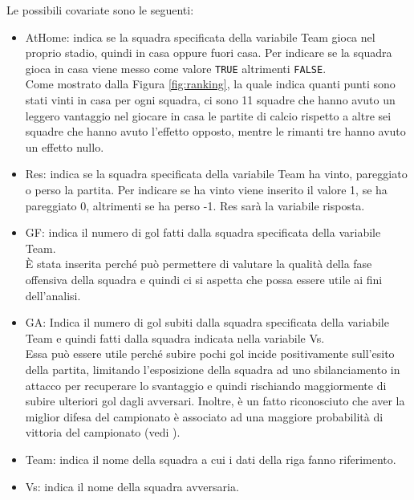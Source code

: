 Le possibili covariate sono le seguenti:
\begin{itemize}
	\item \textsf{AtHome}: indica se la squadra specificata della variabile \textsf{Team} gioca nel proprio stadio, quindi in casa oppure fuori casa. Per indicare se la squadra gioca in casa viene messo come valore \texttt{TRUE} altrimenti \texttt{FALSE}. \\
	Come mostrato dalla Figura \ref{fig:ranking}, la quale indica quanti punti sono stati vinti in casa per ogni squadra, ci sono 11 squadre che hanno avuto un leggero vantaggio nel giocare in casa le partite di calcio rispetto a altre sei squadre che hanno avuto l'effetto opposto, mentre le rimanti tre hanno avuto un effetto nullo.\\
	\item \textsf{Res}: indica se la squadra specificata della variabile \textsf{Team} ha vinto, pareggiato o perso la partita. Per indicare se ha vinto viene inserito il valore 1, se ha pareggiato 0, altrimenti se ha perso -1. \textsf{Res} sarà la variabile risposta.
	\item \textsf{GF}: indica il numero di gol fatti dalla squadra specificata della variabile \textsf{Team}. \\
	È stata inserita perché può permettere di valutare la qualità della fase offensiva della squadra e quindi ci si aspetta che possa essere utile ai fini dell'analisi.
	\item \textsf{GA}: Indica il numero di gol subiti dalla squadra specificata della variabile \textsf{Team} e quindi fatti dalla squadra indicata nella variabile \textsf{Vs}. \\
	Essa può essere utile perché subire pochi gol incide positivamente sull'esito della partita, limitando l'esposizione della squadra ad uno sbilanciamento in attacco per recuperare lo svantaggio e quindi rischiando maggiormente di subire ulteriori gol dagli avversari. Inoltre, è un fatto riconosciuto che aver la miglior difesa del campionato è associato ad una maggiore probabilità di vittoria del campionato (vedi \textit{\cite{catenaccio}}).
	\item \textsf{Team}: indica il nome della squadra a cui i dati della riga fanno riferimento.
	\item \textsf{Vs}: indica il nome della squadra avversaria.
	

\end{itemize}
